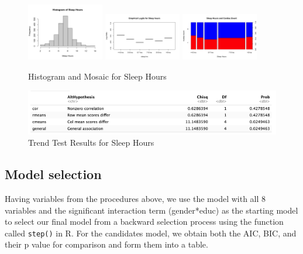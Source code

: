 \documentclass[12pt]{article}
\begin{document}
\begin{figure}[!ht]
\centering
\includegraphics[width=0.3\textwidth]{Img/hist of sleep hours.png}
\includegraphics[width=0.3\textwidth]{Img/Empirical mid for sleep.png}
\includegraphics[width=0.3\textwidth]{Img/Sleep Hour and Cardiac Event.png}
\caption{Histogram and Mosaic for Sleep Hours}
\end{figure}

\begin{figure}[!ht]
    \centering
    \includegraphics[width=\textwidth]{Img/sleep CMHtest.png}
    \caption{Trend Test Results for Sleep Hours}
\end{figure}


\subsection*{Model selection }
Having variables from the procedures above, we use the model with all 8 variables and the significant interaction term (gender*educ) as the starting model to select our final model from a backward selection process using the function called \verb|step()| in R. For the candidates model, we obtain both the AIC, BIC, and their p value for comparison and form them into a table.
\end{document}
